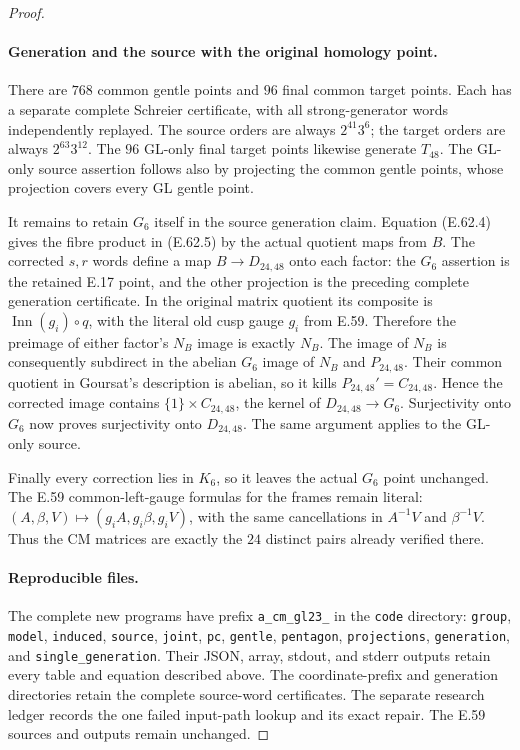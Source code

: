 \begin{proof}
\paragraph{Generation and the source with the original homology point.}
There are $768$ common gentle points and $96$ final common target
points.  Each has a separate complete Schreier certificate, with all
strong-generator words independently replayed.  The source orders
are always $2^{41}3^6$; the target orders are always $2^{63}3^{12}$.
The $96$ GL-only final target points likewise generate $T_{48}$.
The GL-only source assertion follows also by projecting the common
gentle points, whose projection covers every GL gentle point.

It remains to retain $G_6$ itself in the source generation claim.
Equation \textup{(E.62.4)} gives the fibre product in
\textup{(E.62.5)} by the actual quotient maps from $B$.  The corrected
$s,r$ words define a map $B\to D_{24,48}$ onto each factor: the
$G_6$ assertion is the retained E.17 point, and the other projection
is the preceding complete generation certificate.  In the original
matrix quotient its composite is
$\operatorname{Inn}(g_i)\circ q$, with the literal old cusp gauge
$g_i$ from E.59.  Therefore the preimage of either factor's $N_B$
image is exactly $N_B$.  The image of $N_B$ is consequently subdirect
in the abelian $G_6$ image of $N_B$ and $P_{24,48}$.  Their common
quotient in Goursat's description is abelian, so it kills
$P_{24,48}'=C_{24,48}$.  Hence the corrected image contains
$\{1\}\times C_{24,48}$, the kernel of
$D_{24,48}\to G_6$.  Surjectivity onto $G_6$ now proves surjectivity
onto $D_{24,48}$.  The same argument applies to the GL-only source.

Finally every correction lies in $K_6$, so it leaves the actual $G_6$
point unchanged.  The E.59 common-left-gauge formulas for the frames
remain literal: $(A,\beta,V)\mapsto(g_iA,g_i\beta,g_iV)$, with the
same cancellations in $A^{-1}V$ and $\beta^{-1}V$.  Thus the CM
matrices are exactly the $24$ distinct pairs already verified there.

\paragraph{Reproducible files.}
The complete new programs have prefix \texttt{a\_cm\_gl23\_} in the
\texttt{code} directory: \texttt{group}, \texttt{model},
\texttt{induced}, \texttt{source}, \texttt{joint}, \texttt{pc},
\texttt{gentle}, \texttt{pentagon}, \texttt{projections},
\texttt{generation}, and \texttt{single\_generation}.  Their JSON,
array, stdout, and stderr outputs retain every table and equation
described above.  The coordinate-prefix and generation directories
retain the complete source-word certificates.  The separate research
ledger records the one failed input-path lookup and its exact repair.
The E.59 sources and outputs remain unchanged.
\end{proof}
